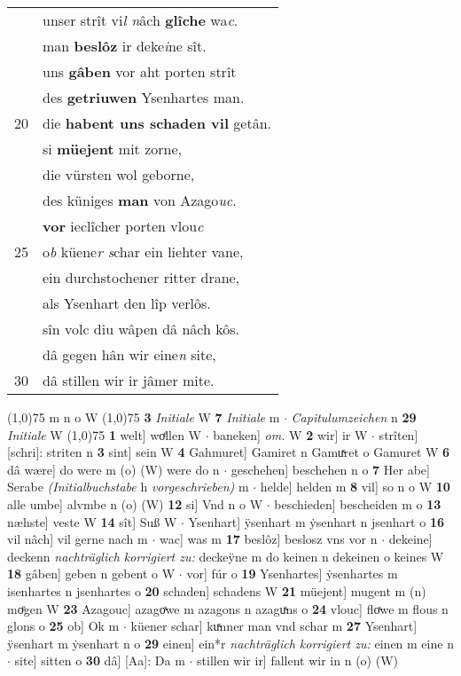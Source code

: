 \documentclass[8pt,a4paper,notitlepage]{article}
\begin{document}
\begin{table}[ht]
\begin{minipage}[t]{0.5\linewidth}
\begin{tabular}{rl}
 & unser strît vi\textit{l n}âch \textbf{glîche} wa\textit{c}.\\ 
 & man \textbf{beslôz} ir deke\textit{i}ne sît.\\ 
 & uns \textbf{gâben} vor aht porten strît\\ 
 & des \textbf{getriuwen} Ysenhartes man.\\ 
20 & die \textbf{habent uns schaden vil} getân.\\ 
 & si \textbf{müejent} mit zorne,\\ 
 & die vürsten wol geborne,\\ 
 & des küniges \textbf{man} von Azago\textit{uc}.\\ 
 & \textbf{vor} ieclîcher porten vlou\textit{c}\\ 
25 & o\textit{b} küene\textit{r s}char ein liehter vane,\\ 
 & ein durchstochener ritter drane,\\ 
 & als Ysenhart den lîp verlôs.\\ 
 & sîn volc diu wâpen dâ nâch kôs.\\ 
 & dâ gegen hân wir eine\textit{n} site,\\ 
30 & dâ stillen wir ir jâmer mite.\\ 
\end{tabular}
\scriptsize
\line(1,0){75} \newline
m n o W \newline
\line(1,0){75} \newline
\textbf{3} \textit{Initiale} W  \textbf{7} \textit{Initiale} m   $\cdot$ \textit{Capitulumzeichen} n  \textbf{29} \textit{Initiale} W  \newline
\line(1,0){75} \newline
\textbf{1} welt] woͤllen W  $\cdot$ baneken] \textit{om.} W \textbf{2} wir] ir W  $\cdot$ strîten] [schri]: striten n \textbf{3} sint] sein W \textbf{4} Gahmuret] Gamiret n Gamuͯret o Gamuret W \textbf{6} dâ wære] do were m (o) (W) were do n  $\cdot$ geschehen] beschehen n o \textbf{7} Her abe] Serabe \textit{(Initialbuchstabe }h \textit{vorgeschrieben)} m  $\cdot$ helde] helden m \textbf{8} vil] so n o W \textbf{10} alle umbe] alvmbe n (o) (W) \textbf{12} si] Vnd n o W  $\cdot$ beschieden] bescheiden m o \textbf{13} næhste] veste W \textbf{14} sît] Suß W  $\cdot$ Ysenhart] ÿsenhart m ẏsenhart n jsenhart o \textbf{16} vil nâch] vil gerne nach m  $\cdot$ wac] was m \textbf{17} beslôz] beslosz vns vor n  $\cdot$ dekeine] deckenn \textit{nachträglich korrigiert zu:} deckeÿne m do keinen n dekeinen o keines W \textbf{18} gâben] geben n gebent o W  $\cdot$ vor] fúr o \textbf{19} Ysenhartes] ẏsenhartes m isenhartes n jsenhartes o \textbf{20} schaden] schadens W \textbf{21} müejent] mugent m (n) moͤgen W \textbf{23} Azagouc] azagoͯwe m azagons n azaguͯns o \textbf{24} vlouc] floͯwe m flous n glons o \textbf{25} ob] Ok m  $\cdot$ küener schar] kuͯnner man vnd schar m \textbf{27} Ysenhart] ÿsenhart m ẏsenhart n o \textbf{29} einen] ein*r \textit{nachträglich korrigiert zu:} einen m eine n  $\cdot$ site] sitten o \textbf{30} dâ] [Aa]: Da m  $\cdot$ stillen wir ir] fallent wir in n (o) (W) \newline

\end{minipage}
\end{table}
\end{document}

